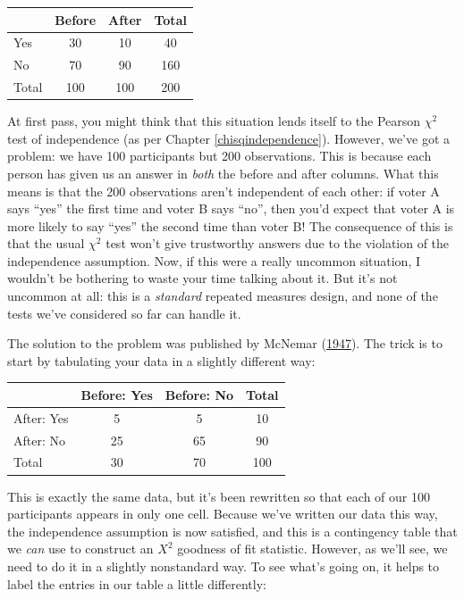 \documentclass[
]{book}
\theoremstyle{definition}
\theoremstyle{definition}
\theoremstyle{definition}
\theoremstyle{definition}
\theoremstyle{remark}
\begin{document}
\begin{longtable}[]{@{}lccc@{}}
\toprule()
& Before & After & Total \\
\midrule()
\endhead
Yes & 30 & 10 & 40 \\
No & 70 & 90 & 160 \\
Total & 100 & 100 & 200 \\
\bottomrule()
\end{longtable}

At first pass, you might think that this situation lends itself to the Pearson \(\chi^2\) test of independence (as per Chapter \ref{chisqindependence}). However, we've got a problem: we have 100 participants but 200 observations. This is because each person has given us an answer in \emph{both} the before and after columns. What this means is that the 200 observations aren't independent of each other: if voter A says ``yes'' the first time and voter B says ``no'', then you'd expect that voter A is more likely to say ``yes'' the second time than voter B! The consequence of this is that the usual \(\chi^2\) test won't give trustworthy answers due to the violation of the independence assumption. Now, if this were a really uncommon situation, I wouldn't be bothering to waste your time talking about it. But it's not uncommon at all: this is a \emph{standard} repeated measures design, and none of the tests we've considered so far can handle it.

The solution to the problem was published by McNemar (\protect\hyperlink{ref-McNemar1947}{1947}). The trick is to start by tabulating your data in a slightly different way:

\begin{longtable}[]{@{}lccc@{}}
\toprule()
& Before: Yes & Before: No & Total \\
\midrule()
\endhead
After: Yes & 5 & 5 & 10 \\
After: No & 25 & 65 & 90 \\
Total & 30 & 70 & 100 \\
\bottomrule()
\end{longtable}

This is exactly the same data, but it's been rewritten so that each of our 100 participants appears in only one cell. Because we've written our data this way, the independence assumption is now satisfied, and this is a contingency table that we \emph{can} use to construct an \(X^2\) goodness of fit statistic. However, as we'll see, we need to do it in a slightly nonstandard way. To see what's going on, it helps to label the entries in our table a little differently:
\end{document}
